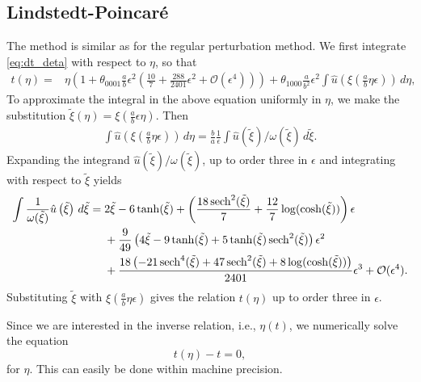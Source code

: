 \subsection*{Lindstedt-Poincar\'e}
The method is similar as for the regular perturbation method. We first
integrate \cref{eq:dt_deta} with respect to $\eta$, so that
\begin{equation}
\label{eq:tOfTau}
\begin{aligned}
    t(\eta) ={}& \eta \left( 1 + \theta_{0001}\frac{a}{b}\epsilon^2\left(\frac{10}{7}+ \frac{288}{2401} \epsilon^2 + \mathcal{O}(\epsilon^4) \right) \right) + 
				 \theta_{1000} \frac{a}{b^2} \epsilon^2 \int  
				     \hat{u}\left(\xi\left(\frac{a}{b}\eta\epsilon \right)\right)
					 \, d\eta,
\end{aligned}
\end{equation}
To approximate the integral in the above equation uniformly in $\eta$, we make the
substitution $\tilde{\xi}(\eta) = \xi\left(\frac{a}{b}\epsilon \eta \right)$. Then
\begin{equation*}
\begin{aligned}
\int  \hat{u}\left(\xi\left(\frac{a}{b}\eta\epsilon \right)\right) \, d\eta
= \frac{b}{a} \frac{1}{\epsilon} \int \hat{u}(\tilde\xi)/\omega(\tilde\xi) \,
		d\tilde\xi.
\end{aligned}
\end{equation*}
Expanding the integrand $ \hat{u}(\tilde\xi)/\omega(\tilde\xi)$, up
to order three in $\epsilon$ and integrating with respect to  $\tilde\xi$ yields
\begin{equation}
\label{eq:int_u_s_regular_perturbation}
\begin{aligned}
\int
\frac{1}{\omega(\tilde\xi)} \hat{u}\left(\tilde\xi\right) \, d\tilde\xi
={}& 2 \tilde\xi -6 \tanh (\tilde\xi ) + 
     \left( \frac{18 \operatorname{sech}^2(\tilde\xi )}{7}+\frac{12}{7} \log (\cosh (\tilde\xi ))
		 \right) \epsilon \\ &+
		 \frac{9}{49} \left(4 \tilde\xi -9 \tanh (\tilde\xi )+5 \tanh (\tilde\xi ) \operatorname{sech}^2(\tilde\xi
		 )\right) \epsilon^2 \\ &+
		 \frac{18 \left(-21 \operatorname{sech}^4(\tilde\xi )+47 \operatorname{sech}^2(\tilde\xi )+8 \log (\cosh
		 (\tilde\xi ))\right)}{2401} \epsilon^3 + \mathcal{O}(\epsilon^4).
\end{aligned}
\end{equation}
Substituting $\tilde\xi$ with  $\xi(\frac{a}{b}\eta\epsilon)$ gives the relation
$t(\eta)$ up to order three in $\epsilon$. 

Since we are interested in the inverse relation, i.e., $\eta(t)$, we numerically
solve the equation 
\begin{equation*}
    t(\eta) - t = 0,
\end{equation*}
for $\eta$. This can easily be done within machine precision.


